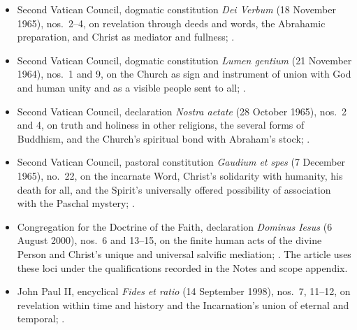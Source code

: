 {\fontsize{8.6}{9.6}\selectfont
\begin{itemize}[itemsep=0pt,parsep=0pt,topsep=0.05em]
\item Second Vatican Council, dogmatic constitution \emph{Dei Verbum} (18 November 1965), nos.~2--4, on revelation through deeds and words, the Abrahamic preparation, and Christ as mediator and fullness; .
\item Second Vatican Council, dogmatic constitution \emph{Lumen gentium} (21 November 1964), nos.~1 and 9, on the Church as sign and instrument of union with God and human unity and as a visible people sent to all; .
\item Second Vatican Council, declaration \emph{Nostra aetate} (28 October 1965), nos.~2 and 4, on truth and holiness in other religions, the several forms of Buddhism, and the Church's spiritual bond with Abraham's stock; .
\item Second Vatican Council, pastoral constitution \emph{Gaudium et spes} (7 December 1965), no.~22, on the incarnate Word, Christ's solidarity with humanity, his death for all, and the Spirit's universally offered possibility of association with the Paschal mystery; .
\item Congregation for the Doctrine of the Faith, declaration \emph{Dominus Iesus} (6 August 2000), nos.~6 and 13--15, on the finite human acts of the divine Person and Christ's unique and universal salvific mediation; . The article uses these loci under the qualifications recorded in the Notes and scope appendix.
\item John Paul II, encyclical \emph{Fides et ratio} (14 September 1998), nos.~7, 11--12, on revelation within time and history and the Incarnation's union of eternal and temporal; .
\end{itemize}}

